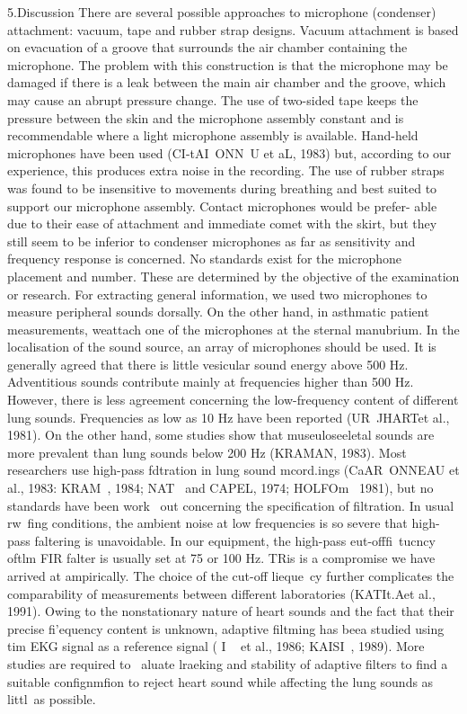 5.Discussion
There are several possible approaches to microphone
(condenser) attachment: vacuum, tape and rubber strap designs.
Vacuum attachment is based on evacuation of a groove that
surrounds the air chamber containing the microphone. The
problem with this construction is that the microphone may be
damaged if there is a leak between the main air chamber and
the groove, which may cause an abrupt pressure change. The
use of two-sided tape keeps the pressure between the skin and
the microphone assembly constant and is recommendable
where a light microphone assembly is available. Hand-held
microphones have been used (CI-tAI~ONN~U et aL, 1983) but,
according to our experience, this produces extra noise in the
recording. The use of rubber straps was found to be insensitive
to movements during breathing and best suited to support our
microphone assembly. Contact microphones would be prefer-
able due to their ease of attachment and immediate comet with
the skirt, but they still seem to be inferior to condenser
microphones as far as sensitivity and frequency response is
concerned.
No standards exist for the microphone placement and
number. These are determined by the objective of the
examination or research. For extracting general information,
we used two microphones to measure peripheral sounds
dorsally. On the other hand, in asthmatic patient measurements,
weattach one of the microphones at the sternal manubrium. In
the localisation of the sound source, an array of microphones
should be used.
It is generally agreed that there is little vesicular sound
energy above 500 Hz. Adventitious sounds contribute mainly
at frequencies higher than 500 Hz. However, there is less
agreement concerning the low-frequency content of different
lung sounds. Frequencies as low as 10 Hz have been reported
(UR~JHARTet al., 1981). On the other hand, some studies show
that museuloseeletal sounds are more prevalent than lung
sounds below 200 Hz (KRAMAN, 1983). Most researchers use
high-pass fdtration in lung sound mcord.ings (CaAR~ONNEAU
et al., 1983: KRAM~, 1984; NAT~ and CAPEL, 1974;
HOLFOm~ 1981), but no standards have been work~ out
concerning the specification of filtration. In usual rw~fing
conditions, the ambient noise at low frequencies is so severe
that high-pass faltering is unavoidable. In our equipment, the
high-pass eut-offfi~tucncy oftlm FIR falter is usually set at 75
or 100 Hz. TRis is a compromise we have arrived at
ampirically. The choice of the cut-off lieque~cy further
complicates the comparability of measurements between
different laboratories (KATIt.Aet al., 1991).
Owing to the nonstationary nature of heart sounds and the
fact that their precise fi'equency content is unknown, adaptive
filtming has beea studied using tim EKG signal as a reference
signal ( I ~ et al., 1986; KAISI~, 1989). More studies are
required to ~aluate lraeking and stability of adaptive filters to
find a suitable confignmfion to reject heart sound while
affecting the lung sounds as littl~as possible.


